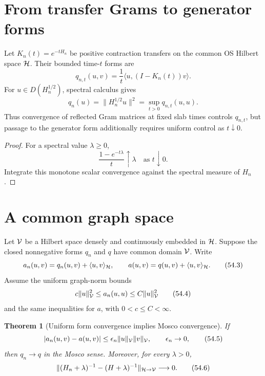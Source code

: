 \documentclass[11pt]{article}
\newtheorem{theorem}{Theorem}[section]
\theoremstyle{remark}
\begin{document}
\section{From transfer Grams to generator forms}

Let \(K_n(t)=e^{-tH_n}\) be positive contraction transfers on the
common OS Hilbert space \({\cal H}\).  Their bounded time-\(t\)
forms are
\[
 q_{n,t}(u,v)=
 \frac1t\langle u,(I-K_n(t))v\rangle.                   \tag{54.1}
\]
For \(u\in D(H_n^{1/2})\), spectral calculus gives
\[
 q_n(u)=\|H_n^{1/2}u\|^2
 =\sup_{t>0}q_{n,t}(u,u).                               \tag{54.2}
\]
Thus convergence of reflected Gram matrices at fixed slab times
controls \(q_{n,t}\), but passage to the generator form additionally
requires uniform control as \(t\downarrow0\).

\begin{proof}
For a spectral value \(\lambda\geq0\),
\[
 \frac{1-e^{-t\lambda}}t\uparrow\lambda
 \quad\text{as }t\downarrow0.
\]
Integrate this monotone scalar convergence against the spectral
measure of \(H_n\).
\end{proof}

\section{A common graph space}

Let \({\cal V}\) be a Hilbert space densely and continuously
embedded in \({\cal H}\).  Suppose the closed nonnegative forms
\(q_n\) and \(q\) have common domain \({\cal V}\).  Write
\[
 a_n(u,v)=q_n(u,v)+\langle u,v\rangle_{\cal H},\qquad
 a(u,v)=q(u,v)+\langle u,v\rangle_{\cal H}.             \tag{54.3}
\]
Assume the uniform graph-norm bounds
\[
 c\|u\|_{\cal V}^2
 \leq a_n(u,u)
 \leq C\|u\|_{\cal V}^2                                \tag{54.4}
\]
and the same inequalities for \(a\), with \(0<c\leq C<\infty\).

\begin{theorem}[Uniform form convergence implies Mosco convergence]
\label{thm:v15v54-uniform-form}
If
\[
 |a_n(u,v)-a(u,v)|
 \leq\epsilon_n\|u\|_{\cal V}\|v\|_{\cal V},
 \qquad\epsilon_n\to0,                                  \tag{54.5}
\]
then \(q_n\to q\) in the Mosco sense.  Moreover, for every
\(\lambda>0\),
\[
 \|(H_n+\lambda)^{-1}-(H+\lambda)^{-1}\|_{
 {\cal H}\to{\cal V}}\longrightarrow0.                  \tag{54.6}
\]
\end{theorem}
\end{document}
